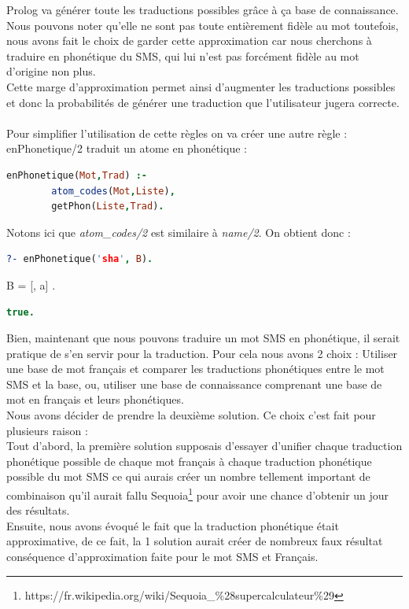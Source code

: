 \documentclass[11pt]{book}
\begin{document}
	Prolog va générer toute les traductions possibles grâce à ça base de connaissance. Nous pouvons noter qu'elle ne sont pas toute entièrement fidèle au mot toutefois, nous avons fait le choix de garder cette approximation car nous cherchons à traduire en phonétique du SMS, qui lui n'est pas forcément fidèle au mot d'origine non plus.\\
	Cette marge d'approximation permet ainsi d'augmenter les traductions possibles et donc la probabilités de générer une traduction que l'utilisateur jugera correcte.
	\paragraph{}
	Pour simplifier l'utilisation de cette règles on va créer une autre règle :\\
	enPhonetique/2 traduit un atome en phonétique :
	\begin{lstlisting}[language=Prolog]
	enPhonetique(Mot,Trad) :-
		atom_codes(Mot,Liste),
		getPhon(Liste,Trad).
	\end{lstlisting}
	
	Notons ici que {\em atom\_codes/2} est similaire à {\em name/2}. On obtient donc :
	\begin{lstlisting}[language=Prolog]
	?- enPhonetique('sha', B).
	\end{lstlisting}
	\indent \indent \indent \indent  B = [, a] .
	\begin{lstlisting}[language=Prolog]
	true.
	\end{lstlisting}
	
	Bien, maintenant que nous pouvons traduire un mot SMS en phonétique, il serait pratique de s'en servir pour la traduction. Pour cela nous avons 2 choix : Utiliser une base de mot français et comparer les traductions phonétiques entre le mot SMS et la base, ou, utiliser une base de connaissance comprenant une base de mot en français et leurs phonétiques.\\
	Nous avons décider de prendre la deuxième solution. Ce choix c'est fait pour plusieurs raison :\\
	Tout d'abord, la première solution supposais d'essayer d'unifier chaque traduction phonétique possible de chaque mot français à chaque traduction phonétique possible du mot SMS ce qui aurais créer un nombre tellement important de combinaison qu'il aurait fallu Sequoia\footnote{https://fr.wikipedia.org/wiki/Sequoia\_\%28supercalculateur\%29} pour avoir une chance d'obtenir un jour des résultats.\\
	Ensuite, nous avons évoqué le fait que la traduction phonétique était approximative, de ce fait, la 1 solution aurait créer de nombreux faux résultat conséquence d'approximation faite pour le mot SMS et Français.
\end{document}
